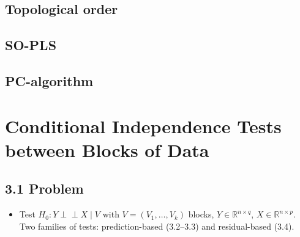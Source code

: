 \documentclass[10pt,leqno]{amsart}
\newcommand{\ci}{\perp\!\!\!\perp}          %
\begin{document}
\subsection{Topological order}
\subsection{SO-PLS}
\subsection{PC-algorithm}

\section{Conditional Independence Tests between Blocks of Data}

\subsection*{3.1 Problem}
\begin{itemize}
\item Test $H_0: Y\ci X\mid V$ with $V=(V_1,\dots,V_k)$ blocks, $Y\in\mathbb{R}^{n\times q}$,
  $X\in\mathbb{R}^{n\times p}$. Two families of tests: prediction-based (3.2--3.3)
  and residual-based (3.4).
\end{itemize}
\end{document}
